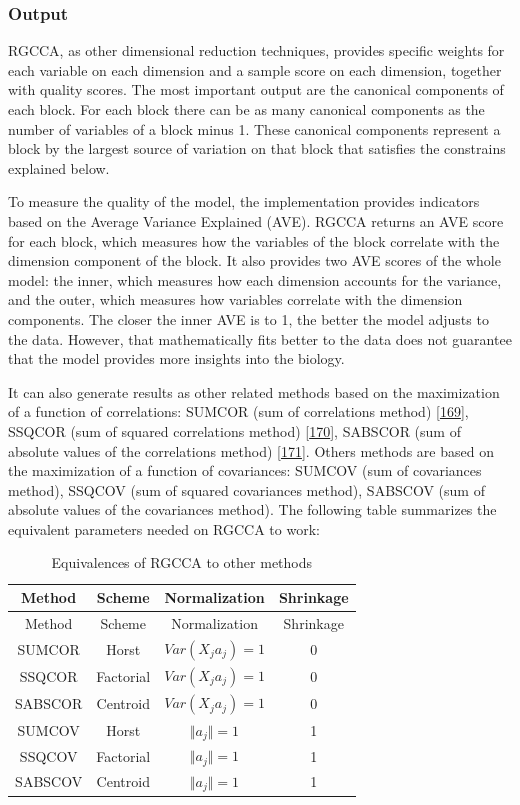 \documentclass[
  12pt,
  a4paper,
  twoside,
  openright]{book}
\begin{document}
\hypertarget{rgcca-output}{%
\subsubsection{Output}\label{rgcca-output}}

RGCCA, as other dimensional reduction techniques, provides specific weights for each variable on each dimension and a sample score on each dimension, together with quality scores.
The most important output are the canonical components of each block.
For each block there can be as many canonical components as the number of variables of a block minus 1.
These canonical components represent a block by the largest source of variation on that block that satisfies the constrains explained below.

To measure the quality of the model, the implementation provides indicators based on the Average Variance Explained (AVE).
RGCCA returns an AVE score for each block, which measures how the variables of the block correlate with the dimension component of the block.
It also provides two AVE scores of the whole model: the inner, which measures how each dimension accounts for the variance, and the outer, which measures how variables correlate with the dimension components.
The closer the inner AVE is to 1, the better the model adjusts to the data.
However, that mathematically fits better to the data does not guarantee that the model provides more insights into the biology.

It can also generate results as other related methods based on the maximization of a function of correlations: SUMCOR (sum of correlations method) {[}\protect\hyperlink{ref-horst1961}{169}{]}, SSQCOR (sum of squared correlations method) {[}\protect\hyperlink{ref-kettenring1971}{170}{]}, SABSCOR (sum of absolute values of the correlations method) {[}\protect\hyperlink{ref-vandegeer1984}{171}{]}.
Others methods are based on the maximization of a function of covariances: SUMCOV (sum of covariances method), SSQCOV (sum of squared covariances method), SABSCOV (sum of absolute values of the covariances method).
The following table summarizes the equivalent parameters needed on RGCCA to work:

\begin{longtable}[]{@{}cccc@{}}
\caption{\label{tab:RGCCA-methods} Equivalences of RGCCA to other methods}\tabularnewline
\toprule
Method & Scheme & Normalization & Shrinkage \\
\midrule
\endfirsthead
\toprule
Method & Scheme & Normalization & Shrinkage \\
\midrule
\endhead
SUMCOR & Horst & \(Var(X_j a_j) = 1\) & 0 \\
SSQCOR & Factorial & \(Var(X_j a_j) = 1\) & 0 \\
SABSCOR & Centroid & \(Var(X_j a_j) = 1\) & 0 \\
SUMCOV & Horst & \(\Vert a_j \Vert = 1\) & 1 \\
SSQCOV & Factorial & \(\Vert a_j \Vert = 1\) & 1 \\
SABSCOV & Centroid & \(\Vert a_j \Vert = 1\) & 1 \\
\bottomrule
\end{longtable}
\end{document}
